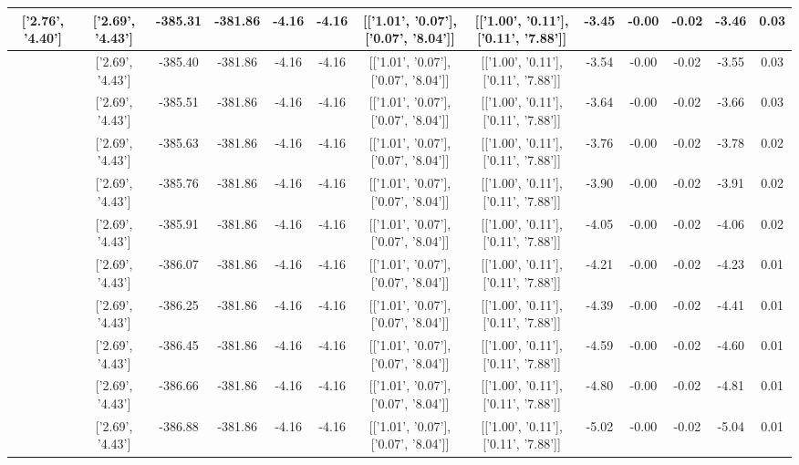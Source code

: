 \begin{table}[htbp]
\begin{adjustbox}{angle=90}
\begin{tabular}{|c|c|c|c|c|c|c|c|c|c|c|c|c|}
 ['2.76', '4.40'] & ['2.69', '4.43'] & -385.31 & -381.86 & -4.16 & -4.16 & [['1.01', '0.07'], ['0.07', '8.04']] & [['1.00', '0.11'], ['0.11', '7.88']] & -3.45 & -0.00 & -0.02 & -3.46 & 0.03\\ \hline
 ['2.77', '4.39'] & ['2.69', '4.43'] & -385.40 & -381.86 & -4.16 & -4.16 & [['1.01', '0.07'], ['0.07', '8.04']] & [['1.00', '0.11'], ['0.11', '7.88']] & -3.54 & -0.00 & -0.02 & -3.55 & 0.03\\ \hline
 ['2.79', '4.39'] & ['2.69', '4.43'] & -385.51 & -381.86 & -4.16 & -4.16 & [['1.01', '0.07'], ['0.07', '8.04']] & [['1.00', '0.11'], ['0.11', '7.88']] & -3.64 & -0.00 & -0.02 & -3.66 & 0.03\\ \hline
 ['2.80', '4.38'] & ['2.69', '4.43'] & -385.63 & -381.86 & -4.16 & -4.16 & [['1.01', '0.07'], ['0.07', '8.04']] & [['1.00', '0.11'], ['0.11', '7.88']] & -3.76 & -0.00 & -0.02 & -3.78 & 0.02\\ \hline
 ['2.81', '4.37'] & ['2.69', '4.43'] & -385.76 & -381.86 & -4.16 & -4.16 & [['1.01', '0.07'], ['0.07', '8.04']] & [['1.00', '0.11'], ['0.11', '7.88']] & -3.90 & -0.00 & -0.02 & -3.91 & 0.02\\ \hline
 ['2.82', '4.37'] & ['2.69', '4.43'] & -385.91 & -381.86 & -4.16 & -4.16 & [['1.01', '0.07'], ['0.07', '8.04']] & [['1.00', '0.11'], ['0.11', '7.88']] & -4.05 & -0.00 & -0.02 & -4.06 & 0.02\\ \hline
 ['2.84', '4.36'] & ['2.69', '4.43'] & -386.07 & -381.86 & -4.16 & -4.16 & [['1.01', '0.07'], ['0.07', '8.04']] & [['1.00', '0.11'], ['0.11', '7.88']] & -4.21 & -0.00 & -0.02 & -4.23 & 0.01\\ \hline
 ['2.85', '4.36'] & ['2.69', '4.43'] & -386.25 & -381.86 & -4.16 & -4.16 & [['1.01', '0.07'], ['0.07', '8.04']] & [['1.00', '0.11'], ['0.11', '7.88']] & -4.39 & -0.00 & -0.02 & -4.41 & 0.01\\ \hline
 ['2.86', '4.35'] & ['2.69', '4.43'] & -386.45 & -381.86 & -4.16 & -4.16 & [['1.01', '0.07'], ['0.07', '8.04']] & [['1.00', '0.11'], ['0.11', '7.88']] & -4.59 & -0.00 & -0.02 & -4.60 & 0.01\\ \hline
 ['2.87', '4.34'] & ['2.69', '4.43'] & -386.66 & -381.86 & -4.16 & -4.16 & [['1.01', '0.07'], ['0.07', '8.04']] & [['1.00', '0.11'], ['0.11', '7.88']] & -4.80 & -0.00 & -0.02 & -4.81 & 0.01\\ \hline
 ['2.89', '4.34'] & ['2.69', '4.43'] & -386.88 & -381.86 & -4.16 & -4.16 & [['1.01', '0.07'], ['0.07', '8.04']] & [['1.00', '0.11'], ['0.11', '7.88']] & -5.02 & -0.00 & -0.02 & -5.04 & 0.01\\ \hline

\end{tabular}
\end{adjustbox}
\end{table}
